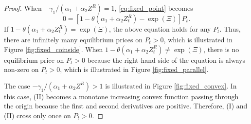\documentclass[11pt, a4paper]{article}
\theoremstyle{remark}
\begin{document}
\begin{proof}
When $-\gamma_1/(\alpha_1+\alpha_2 Z^R) = 1$, \eqref{eq:fixed_point} becomes
\[ 0 = [1 - \theta (\alpha_1 + \alpha_2 Z^{R}_{t}) - \exp(\Xi)] P_t. \]
If $ 1 - \theta (\alpha_1 + \alpha_2 Z^{R}_{t}) = \exp(\Xi)$, the above equation holds for any $P_t$. 
Thus, there are infinitely many equilibrium prices on $P_t >0$, which is illustrated in Figure \ref{fig:fixed_coinside}.
When $ 1 - \theta (\alpha_1 + \alpha_2 Z^{R}_{t}) \ne \exp(\Xi)$, there is no equilibrium price on $P_t >0$ because the right-hand side of the equation is always non-zero on $P_t >0$, which is illustrated in Figure \ref{fig:fixed_parallel}.

The case $-\gamma_1/(\alpha_1+\alpha_2 Z^R) > 1$ is illustrated in Figure \ref{fig:fixed_convex}. In this case, (II) becomes a monotone increasing convex function passing through the origin because the first and second derivatives are positive. Therefore, (I) and (II) cross only once on $P_t >0$.




\end{proof}
\end{document}
